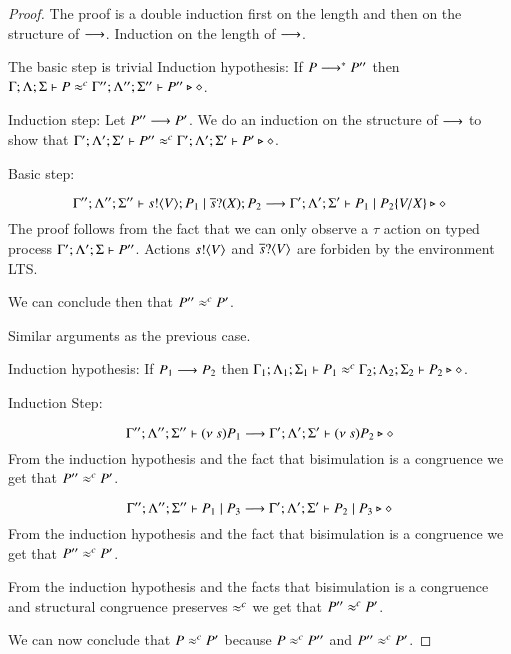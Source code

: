 \begin{proof}
	The proof is a double induction first on the length and then on the structure of $\longrightarrow$.
	Induction on the length of $\longrightarrow$.

	The basic step is trivial
	Induction hypothesis:
	If $P \longrightarrow^* P''$ then
	$\Gamma; \Lambda; \Sigma \vdash P \approx^{c} \Gamma''; \Lambda''; \Sigma'' \vdash P'' \triangleright \diamond$.

	Induction step:
	Let $P'' \longrightarrow P'$. We do an induction on the structure of $\longrightarrow$
	to show that $\Gamma'; \Lambda'; \Sigma' \vdash P'' \approx^{c} \Gamma'; \Lambda'; \Sigma' \vdash P' \triangleright \diamond$.

	Basic step:

	\[
		\Gamma''; \Lambda''; \Sigma'' \vdash s ! \langle V \rangle ; P_1 \;|\; \overline{s} ? (X) ; P_2 \longrightarrow \Gamma'; \Lambda'; \Sigma' \vdash P_1 \;|\; P_2 \{V/X \} \triangleright \diamond
	\]
	The proof follows from the fact that we can only observe a $\tau$
	action on typed process
	$\Gamma'; \Lambda'; \Sigma \vdash P''$.
	Actions $s ! \langle V \rangle$ and $\overline{s} ? \langle V \rangle$
	are forbiden by the environment LTS.

	We can conclude then that $P'' \approx^{c} P'$.


	Similar arguments as the previous case.

	Induction hypothesis:
	If $P_1 \longrightarrow P_2$ then
	$\Gamma_1; \Lambda_1; \Sigma_1 \vdash P_1 \approx^{c} \Gamma_2; \Lambda_2; \Sigma_2 \vdash P_2 \triangleright \diamond$.

	Induction Step:

	\[
		\Gamma''; \Lambda''; \Sigma'' \vdash (\nu\ s){P_1} \longrightarrow \Gamma'; \Lambda'; \Sigma' \vdash (\nu\ s) P_2 \triangleright \diamond
	\]
	From the induction hypothesis and the fact that bisimulation is a congruence
	we get that $P'' \approx^{c} P'$.


	\[
		\Gamma''; \Lambda''; \Sigma'' \vdash P_1 \;|\; P_3 \longrightarrow \Gamma'; \Lambda'; \Sigma' \vdash P_2 \;|\; P_3 \triangleright \diamond
	\]
	From the induction hypothesis and the fact that bisimulation is a congruence
	we get that $P'' \approx^{c} P'$.


	From the induction hypothesis and the facts that bisimulation is a congruence
	and structural congruence preserves $\approx^{c}$
	we get that $P'' \approx^{c} P'$.

	We can now conclude that
	$P \approx^{c} P'$ because $P \approx^{c} P''$ and $P'' \approx^{c} P'$.
\end{proof}

